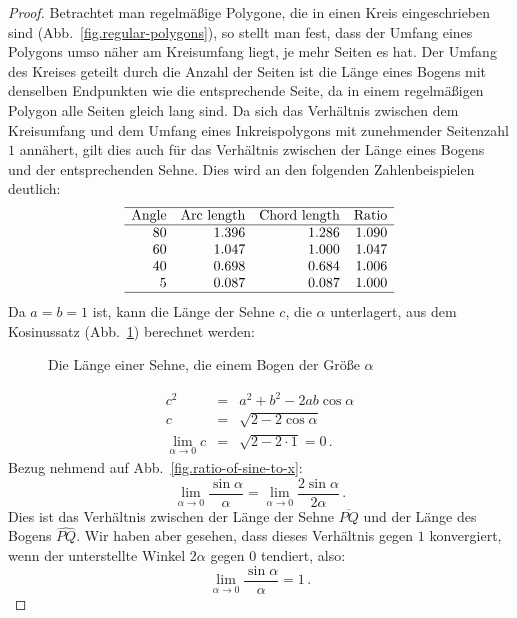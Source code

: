 \begin{proof}
Betrachtet man regelmäßige Polygone, die in einen Kreis eingeschrieben sind (Abb.~\ref{fig.regular-polygons}), so stellt man fest, dass der Umfang eines Polygons umso näher am Kreisumfang liegt, je mehr Seiten es hat. Der Umfang des Kreises geteilt durch die Anzahl der Seiten ist die Länge eines Bogens mit denselben Endpunkten wie die entsprechende Seite, da in einem regelmäßigen Polygon alle Seiten gleich lang sind. Da sich das Verhältnis zwischen dem Kreisumfang und dem Umfang eines Inkreispolygons mit zunehmender Seitenzahl $1$ annähert, gilt dies auch für das Verhältnis zwischen der Länge eines Bogens und der entsprechenden Sehne. Dies wird an den folgenden Zahlenbeispielen deutlich:
\[
\begin{array}{r@{\hspace{10pt}}r@{\hspace{10pt}}r@{\hspace{10pt}}r}
\hline
\textrm{Angle} & \textrm{Arc length} & \textrm{Chord length} & \textrm{Ratio}\\\hline
80 & 1.396 & 1.286  & 1.090\\
60 & 1.047 & 1.000  & 1.047\\
40 & 0.698 & 0.684 & 1.006\\
5  & 0.087 & 0.087 &1.000 \\\hline
\end{array}
\]
Da $a=b=1$ ist, kann die Länge der Sehne $c$, die $\alpha$ unterlagert, aus dem Kosinussatz  (Abb.~\ref{fig.length-of-a-chord}) berechnet werden:
\begin{figure}[t]
\begin{center}
\caption{Die Länge einer Sehne, die einem Bogen der Größe $\alpha$}\label{fig.length-of-a-chord}
\end{center}
\end{figure}
\begin{eqnarray*}
c^2&=&a^2+b^2-2ab\cos \alpha\\
c&=&\sqrt{2-2\cos \alpha}\\
\lim_{\alpha\rightarrow 0} c&=& \sqrt{2-2\cdot 1}=0\,.
\end{eqnarray*}
Bezug nehmend auf Abb.~\ref{fig.ratio-of-sine-to-x}:
\[
\lim_{\alpha \rightarrow 0} \frac{\sin \alpha}{\alpha} = \lim_{\alpha \rightarrow 0} \frac{2\sin \alpha}{2\alpha}\,.
\]
Dies ist das Verhältnis zwischen der Länge der Sehne $\overline{PQ}$ und der Länge des Bogens $\widehat{PQ}$.
Wir haben aber gesehen, dass dieses Verhältnis gegen $1$ konvergiert, wenn der unterstellte Winkel $2\alpha$ gegen $0$ tendiert, also:
\[
\lim_{\alpha \rightarrow 0} \frac{\sin \alpha}{\alpha} = 1\,.
\]
\end{proof}


